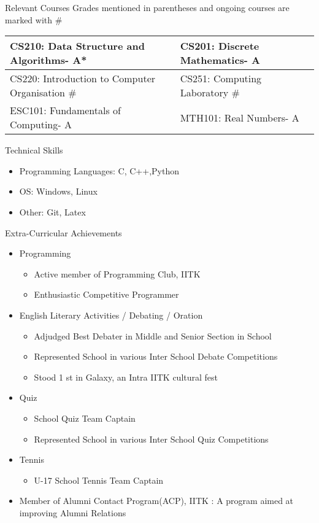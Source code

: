 \documentclass{article}
\begin{document}
\vspace{100pt}	
{\Large Relevant Courses}
\newline
Grades mentioned in parentheses and ongoing courses are marked with \#
\newline
\newline
\begin{tabular}{|l|l|}
\hline
CS210: Data Structure and Algorithms- A* & CS201: Discrete Mathematics- A\\ \hline 
CS220: Introduction to Computer Organisation \# \hspace{30pt} & CS251: Computing Laboratory \# \hspace{100pt} \\ \hline
ESC101: Fundamentals of Computing- A & MTH101: Real Numbers- A \\ \hline
\end{tabular}
\newline
\newline
\newline
{\Large Technical Skills}
\begin{itemize}
\item Programming Languages: C, C++,Python
\item OS: Windows, Linux
\item Other: Git, Latex
\end{itemize} 
\vspace{10pt}
{\Large Extra-Curricular Achievements}
\begin{itemize}
\item Programming
	\begin{itemize}
	\item Active member of Programming Club, IITK
	\item Enthusiastic Competitive Programmer
	\end{itemize}
\item English Literary Activities / Debating / Oration
	\begin{itemize}
	\item Adjudged Best Debater in Middle and Senior Section in School
	\item Represented School in various Inter School Debate Competitions
	\item Stood 1 st in Galaxy, an Intra IITK cultural fest 
	\end{itemize}
\item Quiz
	\begin{itemize}
	\item School Quiz Team Captain
	\item Represented School in various Inter School Quiz Competitions
	\end{itemize}
\item Tennis
	\begin{itemize}
	\item U-17 School Tennis Team Captain
	\end{itemize}
\item Member of Alumni Contact Program(ACP), IITK : A program aimed at improving Alumni Relations
\end{itemize}
\end{document}
